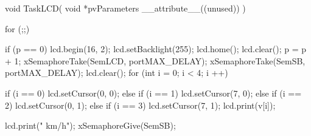 \begin{verbnobox}[\verbarg]
void TaskLCD( void *pvParameters __attribute__((unused)) )  
{
  for (;;)
  {
    if (p == 0) {
      lcd.begin(16, 2);
    lcd.setBacklight(255);
    lcd.home(); 
    lcd.clear();
      p = p + 1;
    }
    xSemaphoreTake(SemLCD, portMAX_DELAY);
    xSemaphoreTake(SemSB, portMAX_DELAY); 
      lcd.clear();
      for (int i = 0; i < 4; i ++){
      if (i == 0)
        lcd.setCursor(0, 0);
      else if (i == 1)
        lcd.setCursor(7, 0);
      else if (i == 2)
        lcd.setCursor(0, 1);
      else if (i == 3)  
        lcd.setCursor(7, 1);
      lcd.print(v[i]);

  }
      lcd.print(" km/h");
      xSemaphoreGive(SemSB);
  }
}
\end{verbnobox}